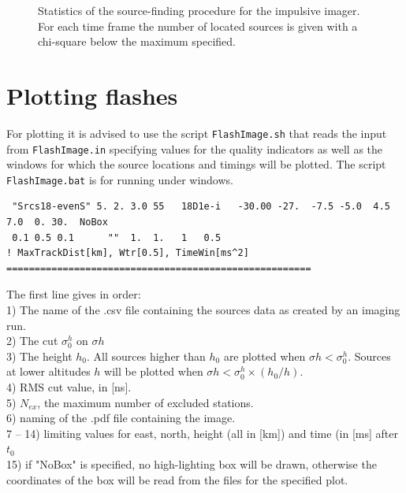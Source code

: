\begin{figure}[th]
	\caption{Statistics of the source-finding procedure for the impulsive imager. For each time frame the number of located sources is given with a chi-square below the maximum specified.}	 
\end{figure}

\section{Plotting flashes}

For plotting it is advised to use the script \verb!FlashImage.sh! that reads the input from \verb!FlashImage.in! specifying values for the quality indicators as well as the windows for which the source locations and timings will be plotted. The script \verb!FlashImage.bat! is for running under windows.

\begin{linenumbers}
\resetlinenumber
\begin{verbatim}
 "Srcs18-evenS" 5. 2. 3.0 55   18D1e-i   -30.00 -27.  -7.5 -5.0  4.5 7.0  0. 30.  NoBox
 0.1 0.5 0.1      ""  1.  1.   1   0.5                                             ! MaxTrackDist[km], Wtr[0.5], TimeWin[ms^2]
======================================================
\end{verbatim}
\end{linenumbers}

The first line gives in order:
\\1) The name of the .csv file containing the sources data as created by an imaging run.
\\2) The cut $ \sigma_0^h $ on $\sigma{h}$
\\3) The height $h_0$. All sources higher than $h_0$ are plotted when  $\sigma{h} < \sigma_0^h$. Sources at lower altitudes $h$ will be plotted when $\sigma{h} < \sigma_0^h \times (h_0/h) $.
\\4) RMS cut value, in [ns].
\\5) $N_{ex}$, the maximum number of excluded stations.
\\6) naming of the .pdf file containing the image.
\\7 -- 14) limiting values for east, north, height (all in [km]) and time (in [ms] after $t_0$
\\15) if "NoBox" is specified, no high-lighting box will be drawn, otherwise the coordinates of the box will be read from the files for the specified plot.

